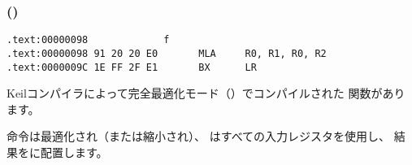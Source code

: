 ﻿\subsubsection{\OptimizingKeilVI (\ARMMode)}

\begin{lstlisting}[label=ARM_leaf_example1,style=customasmARM]
.text:00000098             f
.text:00000098 91 20 20 E0       MLA     R0, R1, R0, R2
.text:0000009C 1E FF 2F E1       BX      LR
\end{lstlisting}


Keilコンパイラによって完全最適化モード（\Othree）でコンパイルされた \ttf 関数があります。

\MOV 命令は最適化され（または縮小され）、
はすべての入力レジスタを使用し、
結果をに配置します。

